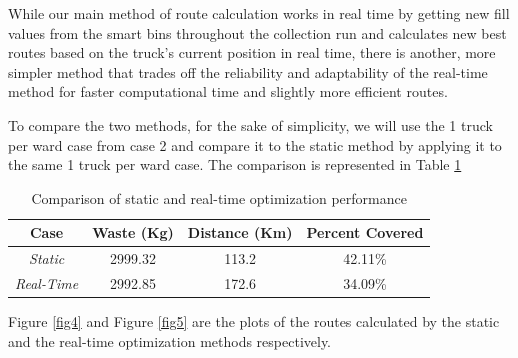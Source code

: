 \documentclass[12pt]{article}
\begin{document}
While our main method of route calculation works in real time by getting new fill values from the smart bins throughout the collection run and calculates new best routes based on the truck's current position in real time, there is another, more simpler method that trades off the reliability and adaptability of the real-time method for faster computational time and slightly more efficient routes.

To compare the two methods, for the sake of simplicity, we will use the 1 truck per ward case from case 2 and compare it to the static method by applying it to the same 1 truck per ward case. The comparison is represented in Table \ref{tab5}

\begin{table}[H]
    \centering
    \caption{Comparison of static and real-time optimization performance} \label{tab5}
    \vspace*{0.3cm}
    \begin{tabular}{|c|c|c|c|}
        \hline Case & Waste (Kg) & Distance (Km) & Percent Covered\\
        \hline \textit{Static}& 2999.32& 113.2 & 42.11\%\\
        \hline \textit{Real-Time}& 2992.85& 172.6& 34.09\%\\
        \hline
    \end{tabular}
\end{table}

Figure \ref{fig4} and Figure \ref{fig5} are the plots of the routes calculated by the static and the real-time optimization methods respectively.
\end{document}
